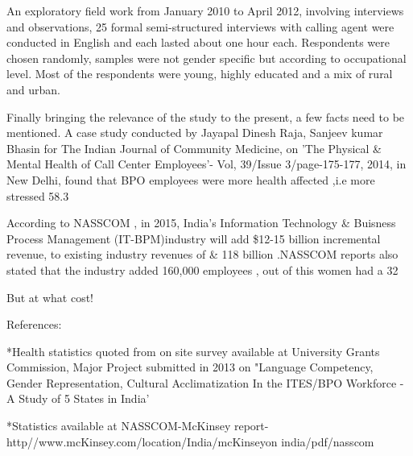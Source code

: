 An exploratory field work  from January 2010 to April 2012, involving interviews and observations, 25 formal semi-structured interviews with calling agent were conducted in English and each lasted about one hour each. Respondents were chosen randomly, samples were not gender specific but according to occupational level. Most of the respondents were young, highly educated and a mix of rural and urban.

Finally bringing the relevance of the study to the present, a few facts need to be mentioned. A case study conducted by Jayapal Dinesh Raja, Sanjeev kumar Bhasin for The Indian Journal of Community Medicine, on 'The Physical & Mental Health of Call Center Employees'- Vol, 39/Issue 3/page-175-177, 2014, in New Delhi, found that BPO employees were more health affected ,i.e more stressed 58.3%

According to NASSCOM , in 2015, India's Information Technology & Buisness Process Management (IT-BPM)industry will add \$12-15 billion incremental revenue, to existing industry revenues of & 118 billion .NASSCOM reports also stated that the industry added 160,000 employees , out of this women had a 32 %

But at what cost!

 References: 
 
 *Health statistics quoted from on site survey available at University Grants Commission, Major Project submitted in 2013 on "Language Competency, Gender Representation, Cultural Acclimatization In the ITES/BPO Workforce - A Study of 5 States in India'
 
 *Statistics available at NASSCOM-McKinsey report- http//www.mcKinsey.com/location/India/mcKinseyon india/pdf/nasscom
    
    